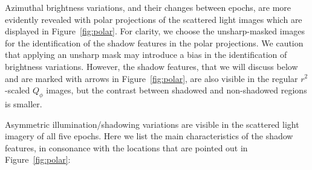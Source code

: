 \documentclass[twocolumn,tighten]{aastex61}
\begin{document}
Azimuthal brightness variations, and their changes between epochs, are more evidently revealed with polar projections of the scattered light images which are displayed in Figure~\ref{fig:polar}. For clarity, we choose the unsharp-masked images for the identification of the shadow features in the polar projections. We caution that applying an unsharp mask may introduce a bias in the identification of brightness variations. However, the shadow features, that we will discuss below and are marked with arrows in Figure~\ref{fig:polar}, are also visible in the regular $r^2$-scaled $Q_\phi$ images, but the contrast between shadowed and non-shadowed regions is smaller.

Asymmetric illumination/shadowing variations are visible in the scattered light imagery of all five epochs. Here we list the main characteristics of the shadow features, in consonance with the locations that are pointed out in Figure~\ref{fig:polar}:
\end{document}
